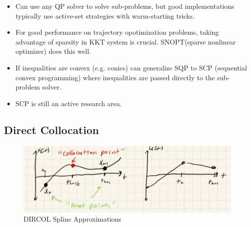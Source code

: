 \begin{itemize}
    \item Can use any QP solver to solve sub-problems, but good implementations typically use active-set strategies with warm-starting tricks.
    \item For good performance on trajectory opotimization problems, taking advantage of sparsity in KKT system is crucial. SNOPT(sparse nonlinear optimizer) does this well.
    \item If inequalities are convex (e.g. conics) can generalize SQP to SCP (sequential convex programming) where inequalities are passed directly to the sub-problem solver.
    \item SCP is still an active research area.
\end{itemize}

\subsection{Direct Collocation}
\begin{figure}
    \centering
    \includegraphics[width=0.4\linewidth]{L10_Images/F1.PNG}
    \caption{DIRCOL Spline Approximations}
    \label{fig:l10f1}
\end{figure}

